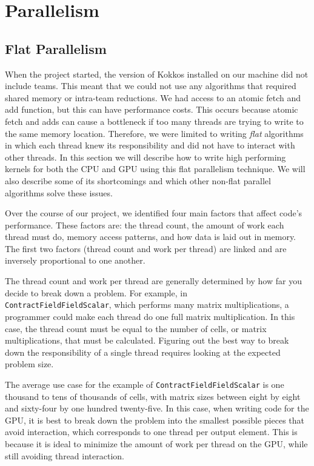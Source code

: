 \chapter{Parallelism}

\section{Flat Parallelism}
When the project started, the version of Kokkos installed on our machine did
not include teams. This meant that we could not use any algorithms that
required shared memory or intra-team reductions. We had access to an atomic fetch and add
function, but this can have performance costs. This occurs because atomic fetch and adds can 
cause a bottleneck if too many threads
are trying to write to the same memory location. Therefore, we were limited to
writing \emph{flat} algorithms in which each thread knew its responsibility and did not
have to interact with other threads. In this section we will describe how to write
high performing kernels for both the CPU and GPU using this flat parallelism
technique. We will also describe some of its shortcomings and which other
non-flat parallel algorithms solve these issues.

Over the course of our project, we identified four main factors that affect
code's performance. These factors are: the thread count, the amount of work
each thread must do, memory access patterns, and how data is laid out in memory.
The first two factors (thread count and work per thread) are linked and are 
inversely proportional to one another. 

The thread count and work per thread are generally determined by how far you
decide to break down a problem. For example, in \\ \texttt{ContractFieldFieldScalar}, which performs
many matrix multiplications, a programmer could make each thread do one full matrix
multiplication. In this case, the thread count must be equal to the number of cells,
or matrix multiplications, that must be calculated. Figuring out the best way
to break down the responsibility of a single thread requires looking at the
expected problem size. 

The average use case for the example of
\texttt{ContractFieldFieldScalar} is one thousand to tens of thousands of cells, with
matrix sizes between eight by eight and sixty-four by one hundred twenty-five. In this case, 
when writing code for the GPU, it
is best to break down the problem into the smallest possible pieces that avoid interaction, which corresponds
to one thread per output element. This is
because it is ideal to minimize the amount of work per thread on the GPU, while still
avoiding thread interaction. 

